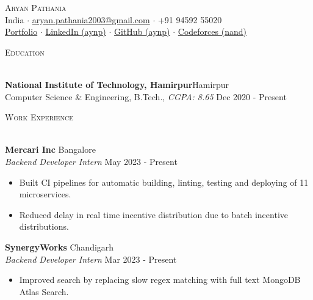 \documentclass[a4paper]{article}
\newcommand{\lineunder} {
    \vspace*{-8pt} \\
    \hspace*{-18pt} \hrulefill \\
}
\newcommand{\header} [1] {
    {\hspace*{-18pt}\vspace*{6pt} \textsc{#1}}
    \vspace*{-6pt} \lineunder
}
\begin{document}

\begin{center}
	{\Huge \scshape {Aryan Pathania}}\\
	\vspace{0.5mm}
	India $\cdot$ \href{mailto: aryan.pathania2003@gmail.com}{aryan.pathania2003@gmail.com} $\cdot$ +91 94592 55020\\
	\vspace{0.5mm}
	\href{https://aryanpathania.vercel.app/}{Portfolio} $\cdot$
	\href{https://linkedin.com/in/aynp/}{LinkedIn (aynp)} $\cdot$
	\href{https://www.github.com/aynp}{GitHub (aynp)} $\cdot$
	\href{https://www.github.com/aynp}{Codeforces (nand)} \\
\end{center}

\vspace{-4mm}

\header{Education}
\vspace{1mm}

\textbf{National Institute of Technology, Hamirpur}\hfill Hamirpur\\
Computer Science \& Engineering, B.Tech., \textit{CGPA: 8.65} \hfill Dec 2020 - Present\\
\vspace{1.5mm}


\header{Work Experience}
\vspace{1mm}

\textbf{Mercari Inc} \hfill Bangalore\\
\textit{Backend Developer Intern} \hfill May 2023 - Present\\
\begin{itemize}
	\item Built CI pipelines for automatic building, linting, testing and deploying of 11 microservices.
    \item Reduced delay in real time incentive distribution due to batch incentive distributions.
\end{itemize}
\vspace{1.5mm}

\textbf{SynergyWorks} \hfill Chandigarh\\
\textit{Backend Developer Intern} \hfill Mar 2023 - Present\\
\begin{itemize}
	\item Improved search by replacing slow regex matching with full text MongoDB Atlas Search.
\end{itemize}
\vspace{1.5mm}
\end{document}
